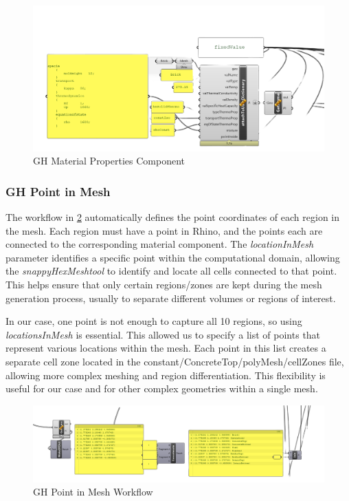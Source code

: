 \begin{figure}[H]
\centering
\includegraphics[width=0.77\columnwidth]{Figures/materialgh.png}
\hspace{0.7cm}
\caption{\gls{GH} Material Properties Component}
\label{matgh}
\end{figure}





\subsubsection{\gls{GH} Point in Mesh}
The workflow in \ref{locgh} automatically defines the point coordinates of each region in the mesh. Each region must have a point in Rhino, and the points each are connected to the corresponding material component. The \textit{locationInMesh} parameter identifies a specific point within the computational domain, allowing the \textit{snappyHexMeshtool} to identify and locate all cells connected to that point. This helps ensure that only certain regions/zones are kept during the mesh generation process, usually to separate different volumes or regions of interest.

In our case, one point is not enough to capture all 10 regions, so using \textit{locationsInMesh} is essential. This allowed us to specify a list of points that represent various locations within the mesh. Each point in this list creates a separate cell zone located in the constant/ConcreteTop/polyMesh/cellZones file, allowing more complex meshing and region differentiation. This flexibility is useful for our case and for other complex geometries within a single mesh.

\begin{figure}[tbh]
\centering
\includegraphics[width=0.77\columnwidth]{Figures/locinmeshgh.png}
\hspace{0.7cm}
\caption{\gls{GH} Point in Mesh Workflow}
\label{locgh}
\end{figure}





